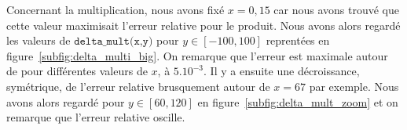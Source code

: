 \documentclass{article}
\begin{document}
Concernant la multiplication, nous avons fixé $x = 0,15$ car nous avons trouvé que cette valeur maximisait l'erreur relative pour le produit. Nous avons alors regardé les valeurs de $\texttt{delta\_mult(x,y)}$ pour $y\in[-100,100]$ reprentées en figure~\ref{subfig:delta_multi_big}. On remarque que l'erreur est maximale autour de pour différentes valeurs de $x$, à $5.10^{-3}$. Il y a ensuite une décroissance, symétrique, de l'erreur relative brusquement autour de $x = 67$ par exemple. Nous avons alors regardé pour $y\in[60,120]$ en figure~\ref{subfig:delta_mult_zoom} et on remarque que l'erreur relative oscille.
 



  




  
 



  




  
 



  
\end{document}
